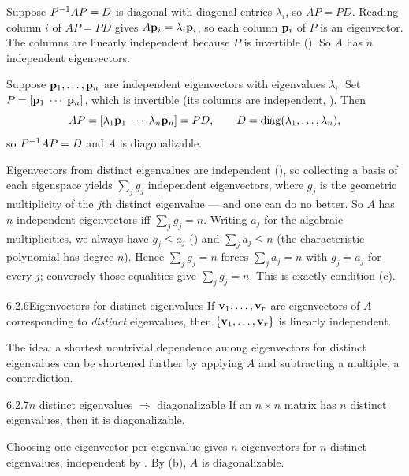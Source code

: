 \begin{prf}
 Suppose $P^{-1} AP=D$ is diagonal with diagonal entries $\lambda_i$, so $AP=PD$. Reading column $i$ of $AP=PD$ gives $A\mathbf{p}_i=\lambda_i\mathbf{p}_i$, so each column $\mathbf{p}_i$ of $P$ is an eigenvector. The columns are linearly independent because $P$ is invertible (). So $A$ has $n$ independent eigenvectors.

 Suppose $\mathbf{p}_1,\dots,\mathbf{p}_n$ are independent eigenvectors with eigenvalues $\lambda_i$. Set $P=[\mathbf{p}_1\;\cdots\;\mathbf{p}_n]$, which is invertible (its columns are independent, ). Then
\[
AP=[\lambda_1\mathbf{p}_1\;\cdots\;\lambda_n\mathbf{p}_n]=PD,\qquad D=\operatorname{diag}(\lambda_1,\dots,\lambda_n),
\]
so $P^{-1} AP=D$ and $A$ is diagonalizable.

 Eigenvectors from distinct eigenvalues are independent (), so collecting a basis of each eigenspace yields $\sum_j g_j$ independent eigenvectors, where $g_j$ is the geometric multiplicity of the $j$th distinct eigenvalue --- and one can do no better. So $A$ has $n$ independent eigenvectors iff $\sum_j g_j=n$. Writing $a_j$ for the algebraic multiplicities, we always have $g_j\le a_j$ () and $\sum_j a_j\le n$ (the characteristic polynomial has degree $n$). Hence $\sum_j g_j=n$ forces $\sum_j a_j=n$ with $g_j=a_j$ for every $j$; conversely those equalities give $\sum_j g_j=n$. This is exactly condition (c).
\end{prf}

\begin{thms}{6.2.6}{Eigenvectors for distinct eigenvalues}
If $\mathbf{v}_1,\dots,\mathbf{v}_r$ are eigenvectors of $A$ corresponding to \emph{distinct} eigenvalues, then $\{\mathbf{v}_1,\dots,\mathbf{v}_r\}$ is linearly independent.
\end{thms}

\begin{proofomit}[MTH2025]The idea: a shortest nontrivial dependence among eigenvectors for distinct eigenvalues can be shortened further by applying $A$ and subtracting a multiple, a contradiction.
\end{proofomit}

\begin{cors}{6.2.7}{$n$ distinct eigenvalues $\Rightarrow$ diagonalizable}
If an $n\times n$ matrix has $n$ distinct eigenvalues, then it is diagonalizable.
\end{cors}

\begin{prf}
Choosing one eigenvector per eigenvalue gives $n$ eigenvectors for $n$ distinct eigenvalues, independent by . By (b), $A$ is diagonalizable.
\end{prf}

